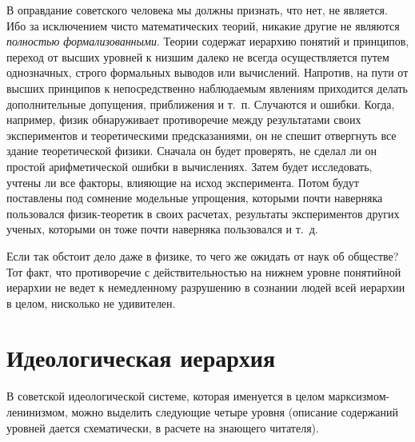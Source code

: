\documentclass{book}
\begin{document}
В оправдание советского человека мы должны признать, что нет, не является. Ибо за исключением чисто математических теорий, 
никакие другие не являются \textit{полностью формализованными}.  Теории содержат иерархию понятий и принципов, переход от высших
уровней к низшим далеко не всегда осу­ществляется путем однозначных, строго формальных выводов или вычислений. Напротив, на пути
от высших принципов к непосредственно наблюдаемым явлениям приходится делать дополнительные допущения, приближения и т.~п. 
Случаются и ошибки. Когда, например, физик обнаруживает противоречие между результатами своих экспериментов и теоретическими 
предсказаниями, он не спешит отвергнуть все здание теоре­тической физики. Сначала он будет проверять, не сделал ли он простой 
арифметической ошибки в вычислениях. Затем будет исследовать, учтены ли все факторы, влияющие на исход эксперимента. Потом будут 
поставлены под сомнение модель­ные упрощения, которыми почти наверняка пользовался фи­зик-теоретик в своих расчетах, результаты 
экспериментов других ученых, которыми он тоже почти наверняка пользо­вался и т.~д.

Если так обстоит дело даже в физике, то чего же ожидать от наук об обществе? Тот факт, что противоречие с действи­тельностью на 
нижнем уровне понятийной иерархии не ведет к немедленному разрушению в сознании людей всей иерархии в целом, нисколько не 
удивителен.

\section{Идеологическая иерархия}

В советской идеологической системе, которая именуется в целом марк\-сиз\-мом-ле\-ни\-низ\-мом, можно выделить следующие четыре уровня 
(описание содержаний уровней дается схематически, в расчете на знающего читателя).
\end{document}
